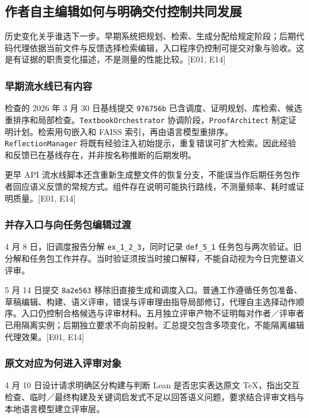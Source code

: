 \subsection[作者自主编辑如何与明确交付控制共同发展]{\texorpdfstring{\protect\hypertarget{l1}{}作者自主编辑如何与明确交付控制共同发展}{作者自主编辑如何与明确交付控制共同发展}}
历史变化关乎谁选下一步。早期系统把规划、检索、生成分配给规定阶段；后期代码代理依据当前文件与反馈选择检索编辑，入口程序仍控制可提交对象与验收。这是有证据的职责变化描述，不是测量的性能比较。[E01, E14]

\subsubsection[早期流水线已有内容]{\texorpdfstring{\protect\hypertarget{l1-1}{}早期流水线已有内容}{早期流水线已有内容}}
检查的 2026 年 3 月 30 日基线提交 \nolinkurl{976756b} 已含调度、证明规划、库检索、候选重排序和局部检查。\nolinkurl{TextbookOrchestrator} 协调阶段，\nolinkurl{ProofArchitect} 制定证明计划。检索用句嵌入和 FAISS 索引，再由语言模型重排序。\nolinkurl{ReflectionManager} 将既有经验注入初始提示，重复错误可扩大检索。因此经验和反馈已在基线存在，并非按名称推断的后期发明。

更早 API 流水线脚本还含重新生成整文件的恢复分支，不能误当作后期任务包作者回应语义反馈的常规方式。组件存在说明可能执行路线，不测量频率、耗时或证明质量。[E01, E14]

\subsubsection[并存入口与向任务包编辑过渡]{\texorpdfstring{\protect\hypertarget{l1-2}{}并存入口与向任务包编辑过渡}{并存入口与向任务包编辑过渡}}
4 月 8 日，旧调度报告分解 \nolinkurl{ex_1_2_3}，同时记录 \nolinkurl{def_5_1} 任务包与两次验证。旧分解和任务包工作并存。当时验证须按当时接口解释，不能自动视为今日完整语义评审。

5 月 14 日提交 \nolinkurl{8a2e563} 移除旧直接生成和调度入口。普通工作遵循任务包准备、草稿编辑、构建、语义评审，错误与评审理由指导局部修订，代理自主选择动作顺序。入口仍控制合格候选与评审材料。五月独立评审产物不证明每对作者／评审者已用隔离实例；后期独立要求不向前投射。汇总提交包含多项变化，不能隔离编辑代理效果。[E01, E14]

\subsubsection[原文对应为何进入评审对象]{\texorpdfstring{\protect\hypertarget{l1-3}{}原文对应为何进入评审对象}{原文对应为何进入评审对象}}
4 月 10 日设计请求明确区分构建与判断 Lean 是否忠实表达原文 TeX，指出交互检查、临时／最终构建及关键词启发式不足以回答语义问题，要求结合评审文档与本地语言模型建立评审层。

